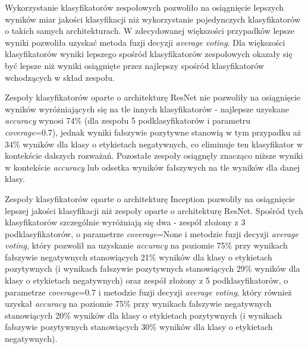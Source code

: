 \documentclass[polish,12pt]{aghthesis}
\begin{document}
\par
Wykorzystanie klasyfikatorów zespołowych pozwoliło na osiągnięcie lepszych wyników miar jakości klasyfikacji niż wykorzystanie pojedynczych klasyfikatorów o takich samych architekturach. W zdecydowanej większości przypadków lepsze wyniki pozwoliła uzyskać metoda fuzji decyzji \textit{average voting}. Dla większości klasyfikatorów wyniki lepszego spośród klasyfikatorów zespołowych okazały się być lepsze niż wyniki osiągnięte przez najlepszy spośród klasyfikatorów wchodzących w skład zespołu.
\par
Zespoły klasyfikatorów oparte o architekturę ResNet nie pozwoliły na osiągnięcie wyników wyróżniających się na tle innych klasyfikatorów - najlepsze uzyskane \textit{accuracy} wynosi 74\% (dla zespołu 5 podklasyfikatorów i parametru \textit{coverage}=0.7), jednak wyniki fałszywie pozytywne stanowią w tym przypadku aż 34\% wyników dla klasy o etykietach negatywnych, co eliminuje ten klasyfikator w kontekście dalszych rozważań. Pozostałe zespoły osiągnęły znacząco niższe wyniki w kontekście \textit{accuracy} lub odsetka wyników fałszywych na tle wyników dla danej klasy.
\par
Zespoły klasyfikatorów oparte o architekturę Inception pozwoliły na osiągnięcie lepszej jakości klasyfikacji niż zespoły oparte o architekturę ResNet. Spośród tych klasyfikatorów szczególnie wyróżniają się dwa - zespół złożony z 3 podklasyfikatorów, o parametrze \textit{coverage}=None i metodzie fuzji decyzji \textit{average voting}, który pozwolił na uzyskanie \textit{accuracy} na poziomie 75\% przy wynikach fałszywie negatywnych stanowiących 21\% wyników dla klasy o etykietach pozytywnych (i wynikach fałszywie pozytywnych stanowiących 29\% wyników dla klasy o etykietach negatywnych) oraz zespół złożony z 5 podklasyfikatorów, o parametrze \textit{coverage}=0.7 i metodzie fuzji decyzji \textit{average voting}, który również uzyskał \textit{accuracy} na poziomie 75\% przy wynikach fałszywie negatywnych stanowiących 20\% wyników dla klasy o etykietach pozytywnych (i wynikach fałszywie pozytywnych stanowiących 30\% wyników dla klasy o etykietach negatywnych).
\par
\end{document}
